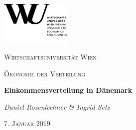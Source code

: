 \documentclass[11pt]{article}
\begin{document}
\begin{titlepage}
	\centering
	\includegraphics[width=0.25\textwidth]{wu.png}\par \vspace{1cm}
	{\scshape\LARGE Wirtschaftsuniversität Wien\par}
	\vspace{1cm}
	{\scshape\Large Ökonomie der Verteilung\par}
	\vspace{1.5cm}
	{\huge\bfseries Einkommensverteilung in Dänemark\par}
	\vspace{2cm}
	{\Large\itshape Daniel Rosenlechner \& Ingrid Setz\par}
	\vfill
	{\scshape\Large 7. Januar 2019\par}
\end{titlepage}
\end{document}
